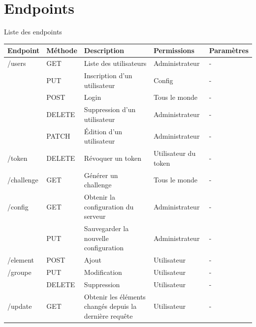 \documentclass[oneside]{report}
\begin{document}
	\section{Endpoints}{
		\par Liste des endpoints
		\par\vspace{.5cm}
		\begin{tabu} to \textwidth {|X[2]|X[1]|X[3]|X[2]|X|}
			\hline
			Endpoint & Méthode & Description & Permissions & Paramètres \\
			\hline
			/users & GET & Liste des utilisateurs & Administrateur & - \\
			& PUT & Inscription d'un utilisateur & Config & - \\
			& POST & Login & Tous le monde & - \\
			& DELETE & Suppression d'un utilisateur & Administrateur & - \\
			& PATCH & Édition d'un utilisateur & Administrateur & - \\
			\hline
			/token & DELETE & Révoquer un token & Utilisateur du token & - \\
			\hline
			/challenge & GET & Générer un challenge & Tous le monde & - \\
			\hline
			/config & GET & Obtenir la configuration du serveur & Administrateur & - \\
			& PUT & Sauvegarder la nouvelle configuration & Administrateur & - \\
			\hline
			/element & POST & Ajout & Utilisateur & -\\
			/groupe & PUT & Modification & Utilisateur & -\\
			& DELETE & Suppression & Utilisateur & -\\
			\hline
			/update & GET & Obtenir les éléments changés depuis la dernière requête & Utilisateur & - \\
			\hline
		\end{tabu}
	}
\end{document}

